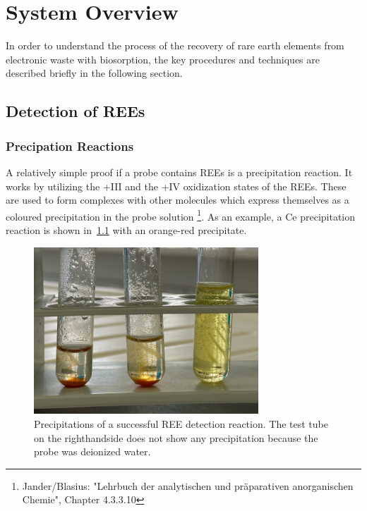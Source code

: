 \chapter{System Overview}

In order to understand the process of the recovery of rare earth elements from electronic waste with biosorption, the key procedures and techniques are described briefly in the following section.


\section{Detection of REEs\authorA}

\subsection{Precipation Reactions}
A relatively simple proof if a probe contains REEs is a precipitation reaction.
It works by utilizing the +III and the +IV oxidization states of the REEs.
These are used to form complexes with other molecules which express themselves as a coloured precipitation in the probe solution \footnote{Jander/Blasius: "Lehrbuch der analytischen und präparativen anorganischen Chemie", Chapter 4.3.3.10}.
As an example, a Ce precipitation reaction is shown in~\ref{fig:cer_precipitation_cropped} with an orange-red precipitate.

\begin{figure}[H]
    \centering
    \includegraphics[width=0.75\textwidth]{./media/images/ree_precipitation_reaction_cropped}
    \caption{Precipitations of a successful REE detection reaction. The test tube on the righthandside does not show any precipitation because the probe was deionized water.}
    \label{fig:cer_precipitation_cropped}
\end{figure}

